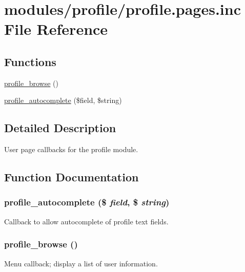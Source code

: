 \hypertarget{profile_8pages_8inc}{
\section{modules/profile/profile.pages.inc File Reference}
\label{profile_8pages_8inc}
}
\subsection*{Functions}
\begin{CompactItemize}
\item 
\hyperlink{profile_8pages_8inc_b7c0f3726d378d3b5cc75dc58674017d}{profile\_\-browse} ()
\item 
\hyperlink{profile_8pages_8inc_c7d4fbf97f28716ec2c6c75927da513e}{profile\_\-autocomplete} (\$field, \$string)
\end{CompactItemize}


\subsection{Detailed Description}
User page callbacks for the profile module. 

\subsection{Function Documentation}
\hypertarget{profile_8pages_8inc_c7d4fbf97f28716ec2c6c75927da513e}{
\subsubsection[{profile\_\-autocomplete}]{\setlength{\rightskip}{0pt plus 5cm}profile\_\-autocomplete (\$ {\em field}, \/  \$ {\em string})}}
\label{profile_8pages_8inc_c7d4fbf97f28716ec2c6c75927da513e}


Callback to allow autocomplete of profile text fields. \hypertarget{profile_8pages_8inc_b7c0f3726d378d3b5cc75dc58674017d}{
\subsubsection[{profile\_\-browse}]{\setlength{\rightskip}{0pt plus 5cm}profile\_\-browse ()}}
\label{profile_8pages_8inc_b7c0f3726d378d3b5cc75dc58674017d}


Menu callback; display a list of user information. 